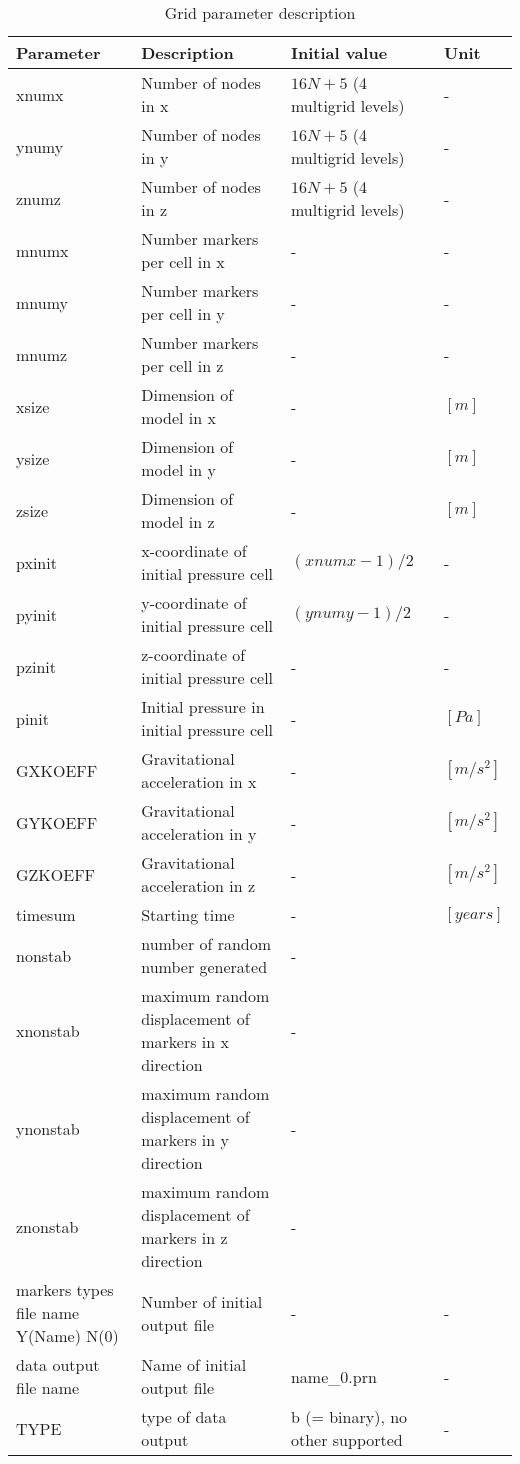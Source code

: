 \begin{table}[H]
\small
\centering
\begin{tabular}{p{3cm} p{6cm} p{3cm} l}
\toprule
Parameter & Description & Initial value & Unit\\
\midrule
xnumx & Number of nodes in x & $16N+5$ (4 multigrid levels) & - \\
ynumy & Number of nodes in y & $16N+5$ (4 multigrid levels) & - \\
znumz & Number of nodes in z & $16N+5$ (4 multigrid levels) & - \\
mnumx & Number markers per cell in x & - & - \\
mnumy & Number markers per cell in y & - & - \\
mnumz & Number markers per cell in z & - & - \\
xsize & Dimension of model in x & - & $[m]$ \\
ysize & Dimension of model in y & - & $[m]$ \\
zsize & Dimension of model in z & - & $[m]$ \\
pxinit & x-coordinate of initial pressure cell & $(xnumx-1)/2$ & - \\
pyinit & y-coordinate of initial pressure cell & $(ynumy-1)/2$ & - \\
pzinit & z-coordinate of initial pressure cell & - & - \\
pinit & Initial pressure in initial pressure cell & - & $[Pa]$ \\
GXKOEFF & Gravitational acceleration in x & - & $[m/s^2]$ \\
GYKOEFF & Gravitational acceleration in y & - & $[m/s^2]$ \\
GZKOEFF & Gravitational acceleration in z & - & $[m/s^2]$ \\
timesum & Starting time & - & $[years]$ \\
nonstab & number of random number generated & - &  \\
xnonstab & maximum random displacement of markers in x direction & - &  \\
ynonstab & maximum random displacement of markers in y direction & - &  \\
znonstab & maximum random displacement of markers in z direction & - &  \\
\footnotesize{markers types file name Y(Name) N(0)} & Number of initial output file & - & - \\
\footnotesize{data output file name} & Name of initial output file & name\_0.prn & - \\
TYPE	& type of data output & b (= binary), no other supported & - \\

\bottomrule
\end{tabular}
\caption{Grid parameter description}
\label{tbl:grid_parameter_description}
\end{table}

